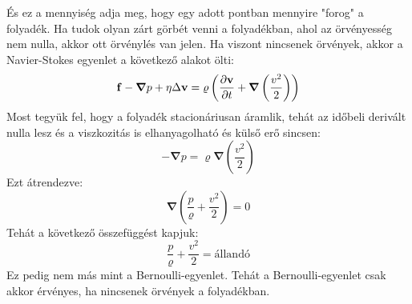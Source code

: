 \documentclass[a4paper,12pt]{article}
\begin{document}
És ez a mennyiség adja meg, hogy egy adott pontban mennyire "forog" a folyadék. Ha tudok olyan zárt görbét venni a folyadékban, ahol az örvényesség nem nulla,
akkor ott örvénylés van jelen. Ha viszont nincsenek örvények, akkor a Navier-Stokes egyenlet a következő alakot ölti:
\begin{equation}
    \bold{f} - \boldsymbol{\nabla} p + \eta \Delta \bold{v} = \varrho \left(\frac{\partial \bold{v}}{\partial t} + \boldsymbol{\nabla} \left(\frac{v^2}{2}\right)\right)
\end{equation}
Most tegyük fel, hogy a folyadék stacionáriusan áramlik, tehát az időbeli derivált nulla lesz és a viszkozitás is elhanyagolható és külső erő sincsen:
\begin{equation}
    - \boldsymbol{\nabla} p = \varrho \boldsymbol{\nabla} \left(\frac{v^2}{2}\right)
\end{equation}
Ezt átrendezve:
\begin{equation}
    \boldsymbol{\nabla} \left(\frac{p}{\varrho} + \frac{v^2}{2}\right) = 0
\end{equation}
Tehát a következő összefüggést kapjuk:
\begin{equation}
    \frac{p}{\varrho} + \frac{v^2}{2} = \text{állandó}
\end{equation}
Ez pedig nem más mint a Bernoulli-egyenlet. Tehát a Bernoulli-egyenlet csak akkor érvényes, ha nincsenek örvények a folyadékban.
\end{document}
